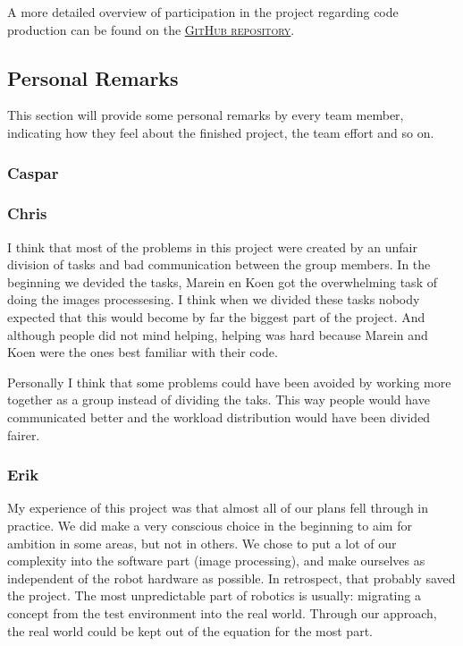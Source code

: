 \documentclass[10pt, abstracton, twocolumn]{scrartcl}
\newcommand{\link}[2]{\textsc{\href{#1}{#2}}}
\begin{document}
\begin{appendices}
\begin{samepage}
\end{samepage}

A more detailed overview of participation in the project regarding code production can be found on the \link{https://github.com/MareinK/robotica2}{GitHub repository}.

\subsection{Personal Remarks}
This section will provide some personal remarks by every team member, indicating how they feel about the finished project, the team effort and so on.

\subsubsection{Caspar}


\subsubsection{Chris}
I think that most of the problems in this project were created by an unfair division of tasks and bad communication between the group members. In the beginning we devided the tasks, Marein en Koen got the overwhelming task of doing the images processesing. I think when we divided these tasks nobody expected that this would become by far the biggest part of the project. And although people did not mind helping, helping was hard because Marein and Koen were the ones best familiar with their code.  

Personally I think that some problems could have been avoided by working more together as a group instead of dividing the taks. This way people would have communicated better and the workload distribution would have been divided fairer.   

\subsubsection{Erik}
My experience of this project was that almost all of our plans fell through in practice. We did make a very conscious choice in the beginning to aim for ambition in some areas, but not in others. We chose to put a lot of our complexity into the software part (image processing), and make ourselves as independent of the robot hardware as possible. In retrospect, that probably saved the project. The most unpredictable part of robotics is usually: migrating a concept from the test environment into the real world. Through our approach, the real world could be kept out of the equation for the most part.


\end{appendices}
\end{document}
